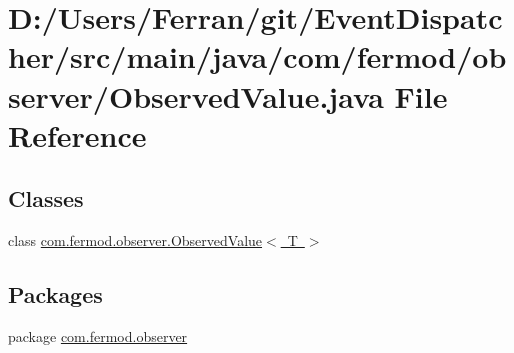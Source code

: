 \hypertarget{a00011}{}\section{D\+:/\+Users/\+Ferran/git/\+Event\+Dispatcher/src/main/java/com/fermod/observer/\+Observed\+Value.java File Reference}
\label{a00011}
\subsection*{Classes}
\begin{DoxyCompactItemize}
\item 
class \mbox{\hyperlink{a00034}{com.\+fermod.\+observer.\+Observed\+Value$<$ T $>$}}
\end{DoxyCompactItemize}
\subsection*{Packages}
\begin{DoxyCompactItemize}
\item 
package \mbox{\hyperlink{a00018}{com.\+fermod.\+observer}}
\end{DoxyCompactItemize}

